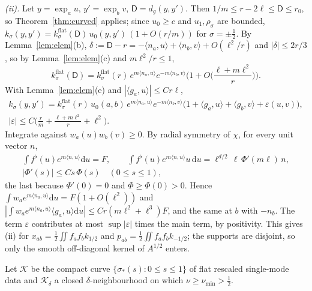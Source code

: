 \documentclass[11pt,a4paper]{article}
\makeatletter
\theoremstyle{stmt}
\theoremstyle{defn}
\theoremstyle{rmk}
\renewenvironment{proof}[1][\proofname]{\par\pushQED{\qed}\normalfont\topsep6\p@\@plus6\p@\relax
  \trivlist\item[\hskip\labelsep{\sffamily\itshape\small #1.}]\ignorespaces}{\popQED\endtrivlist\@endpefalse}
\numberwithin{equation}{section}
\newcommand{\dd}{\mathrm{d}}
\makeatother
\begin{document}
\begin{proof}[Proof of Proposition~\ref{prop:modes}]
\emph{(ii).} Let $y=\exp_au$, $y'=\exp_bv$, $\mathsf D=d_g(y,y')$. Then $1/m\le r-2\ell\le\mathsf D\le r_0$, so Theorem~\ref{thm:curved} applies; since $u_0\ge c$ and $u_1,\rho_\sigma$ are bounded, $k_\sigma(y,y')=k^{\mathrm{flat}}_\sigma(\mathsf D)\,u_0(y,y')\,(1+O(r/m))$ for $\sigma=\pm\tfrac12$. By Lemma~\ref{lem:elem}(b), $\delta:=\mathsf D-r=-\langle n_a,u\rangle+\langle n_b,v\rangle+O(\ell^2/r)$ and $|\delta|\le2r/3$, so by Lemma~\ref{lem:elem}(c) and $m\ell^2/r\le1$,
\[
k^{\mathrm{flat}}_\sigma(\mathsf D)=k^{\mathrm{flat}}_\sigma(r)\,e^{m\langle n_a,u\rangle}e^{-m\langle n_b,v\rangle}\Big(1+O\Big(\frac{\ell+m\ell^2}{r}\Big)\Big).
\]
With Lemma~\ref{lem:elem}(e) and $|\langle g_a,u\rangle|\le Cr\ell$,
\begin{gather*}
k_\sigma(y,y')=k^{\mathrm{flat}}_\sigma(r)\,u_0(a,b)\,e^{m\langle n_a,u\rangle}e^{-m\langle n_b,v\rangle}\big(1+\langle g_a,u\rangle+\langle g_b,v\rangle+\varepsilon(u,v)\big),\\
|\varepsilon|\le C\Big(\frac rm+\frac{\ell+m\ell^2}{r}+\ell^2\Big).
\end{gather*}
Integrate against $w_a(u)w_b(v)\ge0$. By radial symmetry of $\chi$, for every unit vector $n$,
\begin{gather*}
\int f^\flat(u)e^{m\langle n,u\rangle}\dd u=F,\qquad\int f^\flat(u)e^{m\langle n,u\rangle}u\,\dd u=\ell^{d/2}\,\ell\,\Phi'(m\ell)\,n,\\
|\Phi'(s)|\le Cs\,\Phi(s)\quad(0\le s\le1),
\end{gather*}
the last because $\Phi'(0)=0$ and $\Phi\ge\Phi(0)>0$. Hence $\int w_ae^{m\langle n_a,u\rangle}\dd u=F(1+O(\ell^2))$ and $|\int w_ae^{m\langle n_a,u\rangle}\langle g_a,u\rangle\dd u|\le Cr(m\ell^2+\ell^3)F$, and the same at $b$ with $-n_b$. The term $\varepsilon$ contributes at most $\sup|\varepsilon|$ times the main term, by positivity. This gives (ii) for $x_{ab}=\tfrac12\iint f_af_bk_{1/2}$ and $p_{ab}=\tfrac12\iint f_af_bk_{-1/2}$; the supports are disjoint, so only the smooth off-diagonal kernel of $A^{1/2}$ enters.
\end{proof}

Let $\mathcal K$ be the compact curve $\{\sigma_*(s):0\le s\le1\}$ of flat rescaled single-mode data and $\mathcal K_\delta$ a closed $\delta$-neighbourhood on which $\nu\ge\nu_{\min}>\tfrac12$.
\end{document}
